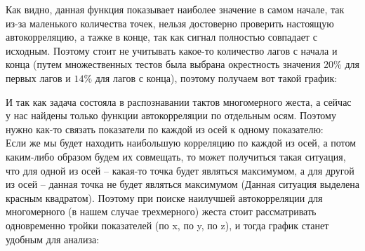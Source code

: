 Как видно, данная функция показывает наиболее значение в самом начале, так из-за маленького количества точек, нельзя достоверно проверить настоящую автокорреляцию, а тажке в конце, так как сигнал полностью совпадает с исходным.
Поэтому стоит не учитывать какое-то количество лагов с начала и конца (путем множественных тестов была выбрана окрестность значения $20 \%$ для первых лагов и $14 \%$ для лагов с конца), поэтому получаем вот такой график:

\begin{figure}[H]
\end{figure}

И так как задача состояла в распознавании тактов многомерного жеста, а сейчас у нас найдены только функции автокорреляции по отдельным осям. Поэтому нужно как-то связать показатели по каждой из осей к одному показателю: \\
Если же мы будет находить наибольшую корреляцию по каждой из осей, а потом каким-либо образом будем их совмещать, то может получиться такая ситуация, что для одной из осей -- какая-то точка будет являться максимумом, а для другой из осей -- данная точка не будет являться максимумом (Данная ситуация выделена красным квадратом).
Поэтому при поиске наилучшей автокорреляции для многомерного (в нашем случае трехмерного) жеста стоит рассматривать одновременно тройки показателей (по x, по y, по z), и тогда график станет удобным для анализа:

\begin{figure}[H]
\end{figure}

